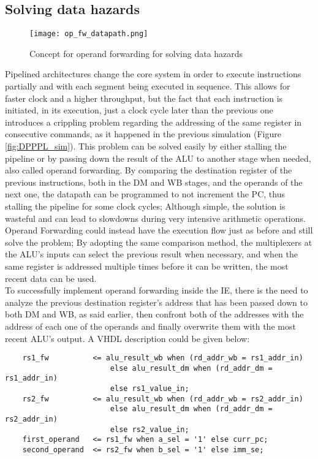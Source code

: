 \subsection{Solving data hazards}
\begin{figure}[!ht]
    \centering
    \texttt{[image: op\_fw\_datapath.png]}
    \label{fig:op_fw}
    \caption{Concept for operand forwarding for solving data hazards}
\end{figure}

Pipelined architectures change the core system in order to execute instructions partially and with each segment being executed in sequence. This allows for faster clock and a higher throughput, but the fact that each instruction is initiated, in its execution, just a clock cycle later than the previous one introduces a crippling problem regarding the addressing of the same register in consecutive commands, as it happened in the previous simulation (Figure \ref{fig:DPPPL_sim}). This problem can be solved easily by either stalling the pipeline or by passing down the result of the ALU to another stage when needed, also called operand forwarding.
By comparing the destination register of the previous instructions, both in the DM and WB stages, and the operands of the next one, the datapath can be programmed to not increment the PC, thus stalling the pipeline for some clock cycles; Although simple, the solution is wasteful and can lead to slowdowns during very intensive arithmetic operations.
Operand Forwarding could instead have the execution flow just as before and still solve the problem; By adopting the same comparison method, the multiplexers at the ALU's inputs can select the previous result when necessary, and when the same register is addressed multiple times before it can be written, the most recent data can be used.\\
To successfully implement operand forwarding inside the IE, there is the need to analyze the previous destination register's address that has been passed down to both DM and WB, as said earlier, then confront both of the addresses with the address of each one of the operands and finally overwrite them with the most recent ALU's output. A VHDL description could be given below:

\begin{verbatim}
    rs1_fw          <= alu_result_wb when (rd_addr_wb = rs1_addr_in) 
                        else alu_result_dm when (rd_addr_dm = rs1_addr_in)
                        else rs1_value_in;
    rs2_fw          <= alu_result_wb when (rd_addr_wb = rs2_addr_in)
                        else alu_result_dm when (rd_addr_dm = rs2_addr_in) 
                        else rs2_value_in;
    first_operand   <= rs1_fw when a_sel = '1' else curr_pc;
    second_operand  <= rs2_fw when b_sel = '1' else imm_se;
\end{verbatim}

